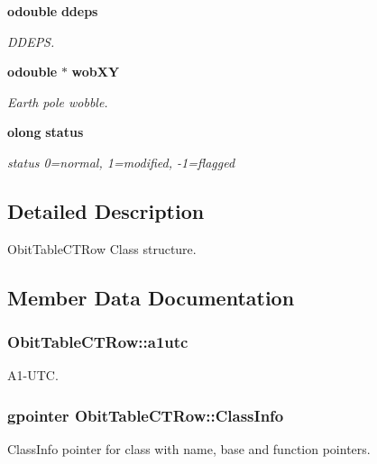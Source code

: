 \begin{CompactItemize}
{\bf odouble} {\bf ddeps}
\begin{CompactList}\small\item\em DDEPS. \item\end{CompactList}\item 
{\bf odouble} $\ast$ {\bf wob\-XY}
\begin{CompactList}\small\item\em Earth pole wobble. \item\end{CompactList}\item 
{\bf olong} {\bf status}
\begin{CompactList}\small\item\em status 0=normal, 1=modified, -1=flagged \item\end{CompactList}\end{CompactItemize}


\subsection{Detailed Description}
Obit\-Table\-CTRow Class structure. 



\subsection{Member Data Documentation}
\subsubsection{ {\bf Obit\-Table\-CTRow::a1utc}}\label{structObitTableCTRow_o9}


A1-UTC. 

\subsubsection{\setlength{\rightskip}{0pt plus 5cm}gpointer {\bf Obit\-Table\-CTRow::Class\-Info}}\label{structObitTableCTRow_o1}


Class\-Info pointer for class with name, base and function pointers. 

